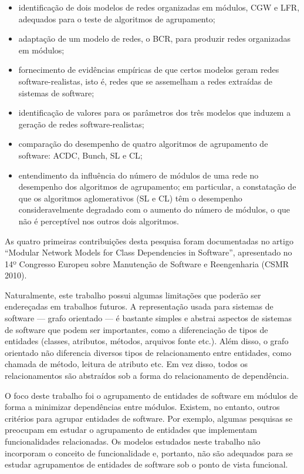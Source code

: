 \begin{itemize}
	\item identificação de dois modelos de redes organizadas em módulos, CGW e LFR, adequados para o teste de algoritmos de agrupamento;
	\item adaptação de um modelo de redes, o BCR, para produzir redes organizadas em módulos;
	\item fornecimento de evidências empíricas de que certos modelos geram redes software-realistas, isto é, redes que se assemelham a redes extraídas de sistemas de software;
	\item identificação de valores para os parâmetros dos três modelos que induzem a geração de redes software-realistas;
	\item comparação do desempenho de quatro algoritmos de agrupamento de software: ACDC, Bunch, SL e CL;
	\item entendimento da influência do número de módulos de uma rede no desempenho dos algoritmos de agrupamento; em particular, a constatação de que os algoritmos aglomerativos (SL e CL) têm o desempenho consideravelmente degradado com o aumento do número de módulos, o que não é perceptível nos outros dois algoritmos.
\end{itemize}

As quatro primeiras contribuições desta pesquisa foram documentadas no artigo ``Modular Network Models for Class Dependencies in Software'', apresentado no 14º Congresso Europeu sobre Manutenção de Software e Reengenharia (CSMR 2010). 


Naturalmente, este trabalho possui algumas limitações que poderão ser endereçadas em trabalhos futuros. A representação usada para sistemas de software --- grafo orientado --- é bastante simples e abstrai aspectos de sistemas de software que podem ser importantes, como a diferenciação de tipos de entidades (classes, atributos, métodos, arquivos fonte etc.). Além disso, o grafo orientado não diferencia diversos tipos de relacionamento entre entidades, como chamada de método, leitura de atributo etc. Em vez disso, todos os relacionamentos são abstraídos sob a forma do relacionamento de dependência.

O foco deste trabalho foi o agrupamento de entidades de software em módulos de forma a minimizar dependências entre módulos. Existem, no entanto, outros critérios para agrupar entidades de software. Por exemplo, algumas pesquisas se preocupam em estudar o agrupamento de entidades que implementam funcionalidades relacionadas. Os modelos estudados neste trabalho não incorporam o conceito de funcionalidade e, portanto, não são adequados para se estudar agrupamentos de entidades de software sob o ponto de vista funcional.

% 
